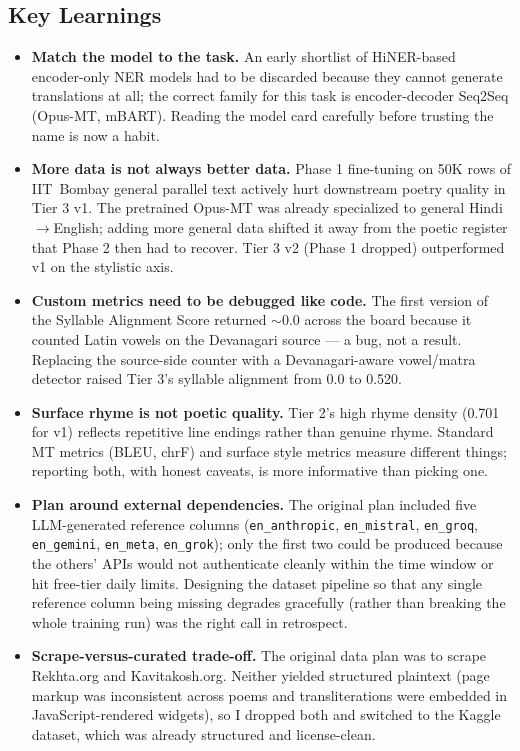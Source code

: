 \documentclass[11pt]{article}
\begin{document}
\subsection{Key Learnings}
\begin{itemize}[leftmargin=*,topsep=0pt]
  \item \textbf{Match the model to the task.} An early shortlist of HiNER-based encoder-only NER models had to be discarded because they cannot generate translations at all; the correct family for this task is encoder-decoder Seq2Seq (Opus-MT, mBART). Reading the model card carefully before trusting the name is now a habit.
  \item \textbf{More data is not always better data.} Phase 1 fine-tuning on 50K rows of IIT~Bombay general parallel text actively hurt downstream poetry quality in Tier 3 v1. The pretrained Opus-MT was already specialized to general Hindi$\rightarrow$English; adding more general data shifted it away from the poetic register that Phase 2 then had to recover. Tier 3 v2 (Phase 1 dropped) outperformed v1 on the stylistic axis.
  \item \textbf{Custom metrics need to be debugged like code.} The first version of the Syllable Alignment Score returned $\sim$0.0 across the board because it counted Latin vowels on the Devanagari source --- a bug, not a result. Replacing the source-side counter with a Devanagari-aware vowel/matra detector raised Tier 3's syllable alignment from 0.0 to 0.520.
  \item \textbf{Surface rhyme is not poetic quality.} Tier 2's high rhyme density (0.701 for v1) reflects repetitive line endings rather than genuine rhyme. Standard MT metrics (BLEU, chrF) and surface style metrics measure different things; reporting both, with honest caveats, is more informative than picking one.
  \item \textbf{Plan around external dependencies.} The original plan included five LLM-generated reference columns (\texttt{en\_anthropic}, \texttt{en\_mistral}, \texttt{en\_groq}, \texttt{en\_gemini}, \texttt{en\_meta}, \texttt{en\_grok}); only the first two could be produced because the others' APIs would not authenticate cleanly within the time window or hit free-tier daily limits. Designing the dataset pipeline so that any single reference column being missing degrades gracefully (rather than breaking the whole training run) was the right call in retrospect.
  \item \textbf{Scrape-versus-curated trade-off.} The original data plan was to scrape Rekhta.org and Kavitakosh.org. Neither yielded structured plaintext (page markup was inconsistent across poems and transliterations were embedded in JavaScript-rendered widgets), so I dropped both and switched to the Kaggle dataset, which was already structured and license-clean.
\end{itemize}
\end{document}
